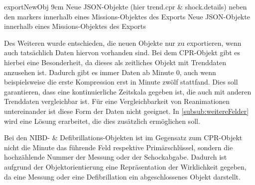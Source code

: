 \bild
{exportNewObj}
{9cm}
{Neue JSON-Objekte (hier \glqq trend.cpr\grqq{} \& \glqq shock.details\grqq{}) neben den \glqq markers\grqq{} innerhalb eines Missions-Objektes des Exports}
{Neue JSON-Objekte innerhalb eines Missions-Objektes des Exports}


Des Weiteren wurde entschieden, die neuen Objekte nur zu exportieren, wenn auch tatsächlich Daten hiervon vorhanden sind.
Bei dem \gls{CPR}-Objekt gibt es hierbei eine Besonderheit, da dieses als zeitliches Objekt mit Trenddaten anzusehen ist.
Dadurch gibt es immer Daten ab Minute 0, auch wenn beispielsweise die erste Kompression erst in Minute zwölf stattfand.
Dies soll garantieren, dass eine kontinuierliche Zeitskala gegeben ist, die auch mit anderen Trenddaten vergleichbar ist.
Für eine Vergleichbarkeit von Reanimationen untereinander ist diese Form der Daten nicht geeignet. 
In \ref{subsub:weitereFelder} wird eine Lösung erarbeitet, die dies zusätzlich ermöglichen soll.

Bei den \gls{NIBD}- \& Defibrillations-Objekten ist im Gegensatz zum CPR-Objekt nicht die Minute das führende Feld respektive Primärschlüssel, sondern die hochzählende Nummer der Messung oder der Schockabgabe.
Dadurch ist aufgrund der Objektorientierung eine Repräsentation der Wirklichkeit gegeben, da eine Messung oder eine Defibrillation ein abgeschlossenes Objekt darstellt.





